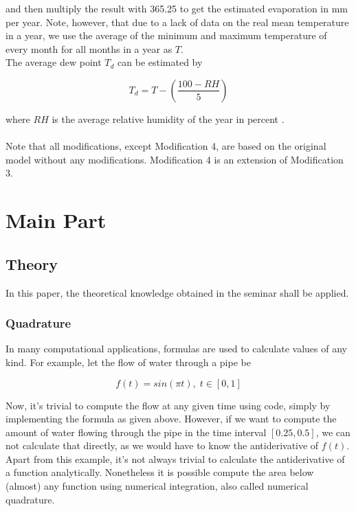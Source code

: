 \documentclass[12pt, a4paper, oneside]{article}
\begin{document}
and then multiply the result with 365.25 to get the estimated evaporation in mm per year. 
Note, however, that due to a lack of data on the real mean temperature in a year, we use the average of the minimum and maximum temperature of every month for all months in a year as $T$. \\
The average dew point $T_d$ can be estimated by 

\begin{equation}
	{T_d} = T - (\frac{100 - RH}{5})
\end{equation}

where $RH$ is the average relative humidity of the year in percent \citep{lawrence2005relationship}.\\\\

Note that all modifications, except Modification 4, are based on the original model without any modifications. 
Modification 4 is an extension of Modification 3. 

	
	\section{Main Part}
	\subsection{Theory}
	
	In this paper, the theoretical knowledge obtained in the seminar shall be applied. 
	
	\subsubsection{Quadrature}
	In many computational applications, formulas 	are used to calculate values of any kind. For example, let the flow of water through a pipe be 

	\begin{equation}
	f(t) = sin(\pi t), \; t \in [0,1]
	\end{equation}

Now, it's trivial to compute the flow at any given time using code, simply by implementing the formula as given above. 
However, if we want to compute the amount of water flowing through the pipe in the time interval $[0.25, 0.5]$, we can not calculate that directly, as we would have to know the antiderivative of $f(t)$. 
Apart from this example, it's not always trivial to calculate the antiderivative of a function analytically. 
Nonetheless it is possible compute the area below (almost) any function using numerical integration, also called numerical quadrature. 
\end{document}
